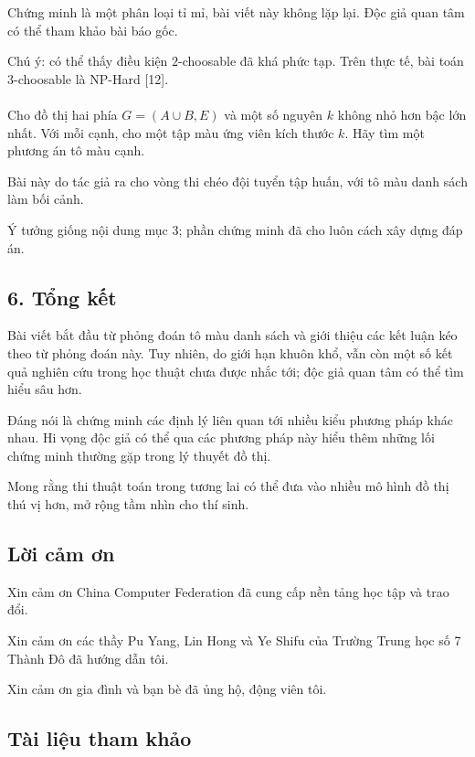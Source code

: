 \documentclass[11pt]{article}
\begin{document}
Chứng minh là một phân loại tỉ mỉ, bài viết này không lặp lại. Độc giả quan
tâm có thể tham khảo bài báo gốc.

Chú ý: có thể thấy điều kiện \(2\)-choosable đã khá phức tạp. Trên thực tế,
bài toán \(3\)-choosable là NP-Hard [12].

\paragraph{}
Cho đồ thị hai phía \(G=(A\cup B,E)\) và một số nguyên \(k\) không nhỏ hơn bậc
lớn nhất. Với mỗi cạnh, cho một tập màu ứng viên kích thước \(k\). Hãy tìm một
phương án tô màu cạnh.

Bài này do tác giả ra cho vòng thi chéo đội tuyển tập huấn, với tô màu danh
sách làm bối cảnh.

Ý tưởng giống nội dung mục 3; phần chứng minh đã cho luôn cách xây dựng đáp án.

\subsection*{6. Tổng kết}

Bài viết bắt đầu từ phỏng đoán tô màu danh sách và giới thiệu các kết luận kéo
theo từ phỏng đoán này. Tuy nhiên, do giới hạn khuôn khổ, vẫn còn một số kết
quả nghiên cứu trong học thuật chưa được nhắc tới; độc giả quan tâm có thể tìm
hiểu sâu hơn.

Đáng nói là chứng minh các định lý liên quan tới nhiều kiểu phương pháp khác
nhau. Hi vọng độc giả có thể qua các phương pháp này hiểu thêm những lối chứng
minh thường gặp trong lý thuyết đồ thị.

Mong rằng thi thuật toán trong tương lai có thể đưa vào nhiều mô hình đồ thị
thú vị hơn, mở rộng tầm nhìn cho thí sinh.

\subsection*{Lời cảm ơn}

Xin cảm ơn China Computer Federation đã cung cấp nền tảng học tập và trao đổi.

Xin cảm ơn các thầy Pu Yang, Lin Hong và Ye Shifu của Trường Trung học số 7
Thành Đô đã hướng dẫn tôi.

Xin cảm ơn gia đình và bạn bè đã ủng hộ, động viên tôi.

\subsection*{Tài liệu tham khảo}
\end{document}
